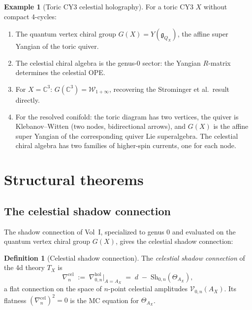 \documentclass[11pt]{article}
\theoremstyle{definition}
\newtheorem{definition}[theorem]{Definition}
\newtheorem{example}[theorem]{Example}
\theoremstyle{remark}
\newcommand{\cV}{\mathcal{V}}
\newcommand{\cW}{\mathcal{W}}
\newcommand{\frakg}{\mathfrak{g}}
\newcommand{\Sh}{\mathrm{Sh}}
\begin{document}
\begin{example}[Toric CY3 celestial holography]
\label{ex:toric-celestial}
For a toric CY3 $X$ without compact 4-cycles:
\begin{enumerate}[label=(\alph*)]
\item The quantum vertex chiral group
 $G(X) = Y(\widehat{\frakg}_{Q_X})$, the affine super Yangian
 of the toric quiver.
\item The celestial chiral algebra is the genus-0 sector: the
 Yangian $R$-matrix determines the celestial OPE.
\item For $X = \mathbb{C}^3$: $G(\mathbb{C}^3) = \cW_{1+\infty}$,
 recovering the Strominger et al.\ result directly.
\item For the resolved conifold: the toric diagram has two vertices,
 the quiver is Klebanov--Witten (two nodes, bidirectional arrows),
 and $G(X)$ is the affine super Yangian of the corresponding
 quiver Lie superalgebra. The celestial chiral algebra has
 two families of higher-spin currents, one for each node.
\end{enumerate}
\end{example}

\section{Structural theorems}
\label{sec:structural}

\subsection{The celestial shadow connection}

The shadow connection of Vol~I, specialized to genus 0 and evaluated
on the quantum vertex chiral group $G(X)$, gives the celestial
shadow connection:

\begin{definition}[Celestial shadow connection]
\label{def:celestial-shadow-connection}
The \emph{celestial shadow connection} of the 4d theory $T_X$ is
\begin{equation}\label{eq:celestial-shadow-connection}
\nabla^{\mathrm{cel}}_{n}
\;:=\;
\nabla^{\mathrm{hol}}_{0,n}\bigl|_{A = A_X}
\;=\;
d \;-\; \Sh_{0,n}(\Theta_{A_X}),
\end{equation}
a flat connection on the space of $n$-point celestial amplitudes
$\cV_{0,n}(A_X)$. Its flatness $(\nabla^{\mathrm{cel}}_n)^2 = 0$
is the MC equation for $\Theta_{A_X}$.
\end{definition}
\end{document}
